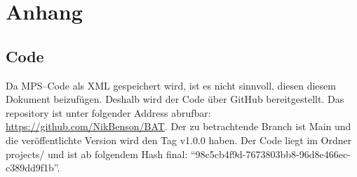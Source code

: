 \appendix


\section{Anhang}\label{sec:anhang}

\subsection{Code}\label{appendix:code}
Da \acs{MPS}--Code als \ac{XML} gespeichert wird, ist es nicht sinnvoll, diesen diesem Dokument beizufügen.
Deshalb wird der Code über GitHub bereitgestellt.
Das repository ist unter folgender Address abrufbar: \href{https://github.com/NikBenson/BAT}{https://github.com/NikBenson/BAT}.
Der zu betrachtende Branch ist Main und die veröffentlichte Version wird den Tag {\ttfamily v1.0.0} haben.
Der Code liegt im Ordner {\ttfamily projects/} und ist ab folgendem Hash final: \enquote{98c5cb4f9d-7673803bb8-96d8e466ec-c389dd9f1b}.

